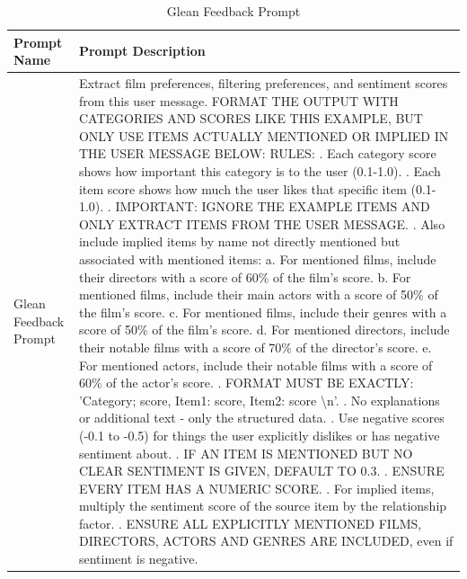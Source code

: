 \begin{table}[H]
   \centering
   \begin{tabular}{|p{3cm}|p{11cm}|} %
   \hline
   \textbf{Prompt Name} & \textbf{Prompt Description} \\ \hline
   Glean Feedback Prompt & Extract film preferences, filtering preferences, and sentiment scores from this user message. \newline
   FORMAT THE OUTPUT WITH CATEGORIES AND SCORES LIKE THIS EXAMPLE, BUT ONLY USE ITEMS ACTUALLY MENTIONED OR IMPLIED IN THE USER MESSAGE BELOW: \newline
   RULES: \newline
   1. Each category score shows how important this category is to the user (0.1-1.0). \newline
   2. Each item score shows how much the user likes that specific item (0.1-1.0). \newline
   3. IMPORTANT: IGNORE THE EXAMPLE ITEMS AND ONLY EXTRACT ITEMS FROM THE USER MESSAGE. \newline
   4. Also include implied items by name not directly mentioned but associated with mentioned items: \newline
      a. For mentioned films, include their directors with a score of 60\% of the film's score. \newline
      b. For mentioned films, include their main actors with a score of 50\% of the film's score. \newline
      c. For mentioned films, include their genres with a score of 50\% of the film's score. \newline
      d. For mentioned directors, include their notable films with a score of 70\% of the director's score. \newline
      e. For mentioned actors, include their notable films with a score of 60\% of the actor's score. \newline
   5. FORMAT MUST BE EXACTLY: 'Category; score, Item1: score, Item2: score \textbackslash n'. \newline
   6. No explanations or additional text - only the structured data. \newline
   7. Use negative scores (-0.1 to -0.5) for things the user explicitly dislikes or has negative sentiment about. \newline
   8. IF AN ITEM IS MENTIONED BUT NO CLEAR SENTIMENT IS GIVEN, DEFAULT TO 0.3. \newline
   9. ENSURE EVERY ITEM HAS A NUMERIC SCORE. \newline
   10. For implied items, multiply the sentiment score of the source item by the relationship factor. \newline
   11. ENSURE ALL EXPLICITLY MENTIONED FILMS, DIRECTORS, ACTORS AND GENRES ARE INCLUDED, even if sentiment is negative. \\ \hline
   \end{tabular}
   \caption{Glean Feedback Prompt}
   \label{tab:llm_prompts_glean_feedback}
   \end{table}